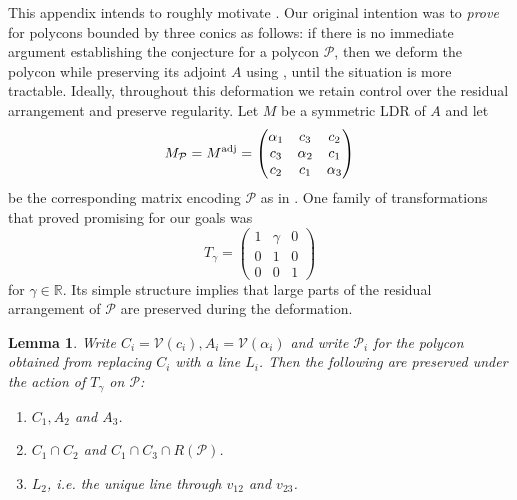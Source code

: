 \documentclass[a4paper,10pt]{amsart}
\theoremstyle{definition}
\theoremstyle{plain}
\newtheorem{lem}[defin]{Lemma}
\newcommand{\cP}{{\mathcal P}}
\newcommand{\cV}{{\mathcal V}}
\newcommand{\R}{{\mathbb R}}
\begin{document}
This appendix intends to roughly motivate . Our original intention was to \emph{prove}  for polycons bounded by three conics as follows: if there is no immediate argument establishing the conjecture for a polycon $\cP$, then we deform the polycon while preserving its adjoint $A$ using , until the situation is more tractable. Ideally, throughout this deformation we retain control over the residual arrangement and preserve regularity. Let $M$ be a symmetric LDR of $A$ and let
\begin{equation*}
    M_\cP = M^{\textup{adj}} = \begin{pmatrix}
         \alpha_1 & c_3 & c_2 \\
         c_3 & \alpha_2 & c_1 \\
         c_2 & c_1 & \alpha_3
    \end{pmatrix}
\end{equation*}
be the corresponding matrix encoding $\cP$ as in . One family of transformations that proved promising for our goals was
\begin{equation*}
    T_\gamma = \begin{pmatrix}
    1&\gamma&0\\
    0&1&0\\
    0&0&1
\end{pmatrix}
\end{equation*}
for $\gamma \in \R$. Its simple structure implies that large parts of the residual arrangement of $\cP$ are preserved during the deformation.

\begin{lem} \label{lem: resPreserv}
 Write $C_i = \cV(c_i), A_i = \cV(\alpha_i)$ and write $\cP_i$ for the polycon obtained from replacing $C_i$ with a line $L_i$. Then the following are preserved under the action of $T_\gamma$ on $\cP$:
 \begin{enumerate}
     \item $C_1, A_2$ and $A_3$.
     \item $C_1 \cap C_2$ and $C_1 \cap C_3 \cap R(\cP)$.
     \item $L_2$, i.e. the unique line through $v_{12}$ and $v_{23}$.
 \end{enumerate}
\end{lem}
\end{document}
